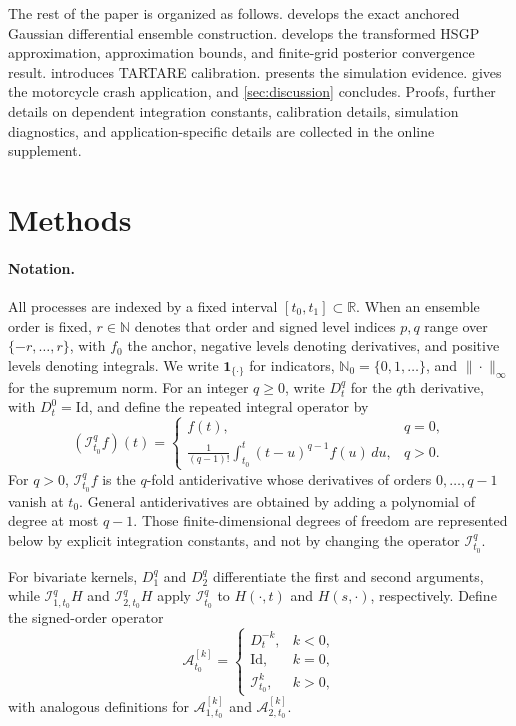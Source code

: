 \documentclass[11pt,a4paper]{article}
\theoremstyle{definition}
\theoremstyle{remark}
\begin{document}
The rest of the paper is organized as follows.   develops the exact anchored Gaussian differential ensemble construction.   develops the transformed HSGP approximation, approximation bounds, and finite-grid posterior convergence result.  introduces TARTARE calibration.   presents the simulation evidence.   gives the motorcycle crash application, and \cref{sec:discussion} concludes.  Proofs, further details on dependent integration constants, calibration details, simulation diagnostics, and application-specific details are collected in the online supplement.


\section{Methods}\label{sec:methods}

\paragraph{Notation.}
All processes are indexed by a fixed interval $[t_0,t_1]\subset\mathbb R$. When an ensemble order is fixed, \(r\in\mathbb N\) denotes that order and signed level indices \(p,q\) range over \(\{-r,\ldots,r\}\), with \(f_0\) the anchor, negative levels denoting derivatives, and positive levels denoting integrals. We write \(\mathbf 1_{\{\cdot\}}\) for indicators, \(\mathbb N_0=\{0,1,\ldots\}\), and \(\|\cdot\|_\infty\) for the supremum norm. For an integer $q\ge0$, write $D_t^q$ for the $q$th derivative, with $D_t^0=\mathrm{Id}$, and define the repeated integral operator by
\[
(\mathcal I_{t_0}^q f)(t)=
\begin{cases}
 f(t), & q=0,\\[3pt]
 \displaystyle \frac{1}{(q-1)!}\int_{t_0}^t (t-u)^{q-1}f(u)\,du, & q>0.
\end{cases}
\]
For $q>0$, $\mathcal I_{t_0}^q f$ is the $q$-fold antiderivative whose derivatives of orders $0,\ldots,q-1$ vanish at $t_0$. General antiderivatives are obtained by adding a polynomial of degree at most $q-1$. Those finite-dimensional degrees of freedom are represented below by explicit integration constants, and not by changing the operator $\mathcal I_{t_0}^q$.

For bivariate kernels, $D_1^q$ and $D_2^q$ differentiate the first and second arguments, while $\mathcal I_{1,t_0}^qH$ and $\mathcal I_{2,t_0}^qH$ apply $\mathcal I_{t_0}^q$ to $H(\cdot,t)$ and $H(s,\cdot)$, respectively. Define the signed-order operator
\[
\mathcal A_{t_0}^{[k]}=
\begin{cases}
D_t^{-k}, & k<0,\\
\mathrm{Id}, & k=0,\\
\mathcal I_{t_0}^{k}, & k>0,
\end{cases}
\]
with analogous definitions for $\mathcal A_{1,t_0}^{[k]}$ and $\mathcal A_{2,t_0}^{[k]}$.
\end{document}
